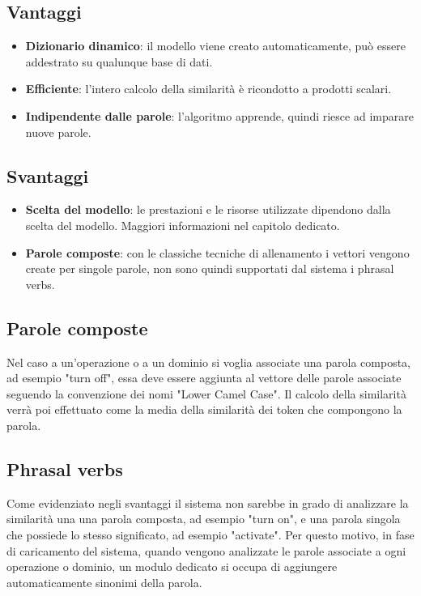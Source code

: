 \documentclass[twoside]{supsistudent}
\begin{document}
\subsection{Vantaggi}
\begin{itemize}
  \item \textbf{Dizionario dinamico}: il modello viene creato automaticamente, può essere addestrato su qualunque base di dati.
  \item \textbf{Efficiente}: l'intero calcolo della similarità è ricondotto a prodotti scalari.
    \item \textbf{Indipendente dalle parole}: l'algoritmo apprende, quindi riesce ad imparare nuove parole.
\end{itemize}
\subsection{Svantaggi}
\begin{itemize}
  \item \textbf{Scelta del modello}: le prestazioni e le risorse utilizzate dipendono dalla scelta del modello. Maggiori informazioni nel capitolo dedicato.
  \item \textbf{Parole composte}: con le classiche tecniche di allenamento i vettori vengono create per singole parole, non sono quindi supportati dal sistema i phrasal verbs.
\end{itemize}
\subsection{Parole composte}
Nel caso a un'operazione o a un dominio si voglia associate una parola composta, ad esempio "turn off", essa deve essere aggiunta al vettore delle parole associate seguendo la convenzione dei nomi "Lower Camel Case". Il calcolo della similarità verrà poi effettuato come la media della similarità dei token che compongono la parola.\cite{lcc}
\subsection{Phrasal verbs}
Come evidenziato negli svantaggi il sistema non sarebbe in grado di analizzare la similarità una una parola composta, ad esempio "turn on", e una parola singola che possiede lo stesso significato, ad esempio "activate".
Per questo motivo, in fase di caricamento del sistema, quando vengono analizzate le parole associate a ogni operazione o dominio, un modulo dedicato si occupa di aggiungere automaticamente sinonimi della parola.
\end{document}
